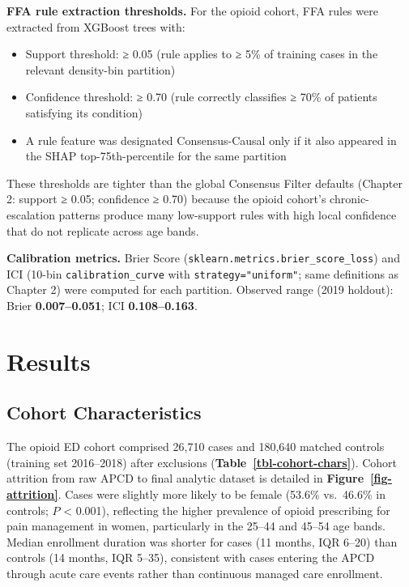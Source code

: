 \documentclass[
  12pt,
]{book}
\providecommand{\tightlist}{%
  \setlength{\itemsep}{0pt}\setlength{\parskip}{0pt}}
\begin{document}
\textbf{FFA rule extraction thresholds.} For the opioid cohort, FFA
rules were extracted from XGBoost trees with:

\begin{itemize}
\tightlist
\item
  Support threshold: ≥ 0.05 (rule applies to ≥ 5\% of training cases in
  the relevant density-bin partition)
\item
  Confidence threshold: ≥ 0.70 (rule correctly classifies ≥ 70\% of
  patients satisfying its condition)
\item
  A rule feature was designated Consensus-Causal only if it also
  appeared in the SHAP top-75th-percentile for the same partition
\end{itemize}

These thresholds are tighter than the global Consensus Filter defaults
(Chapter 2: support ≥ 0.05; confidence ≥ 0.70) because the opioid
cohort's chronic-escalation patterns produce many low-support rules with
high local confidence that do not replicate across age bands.

\textbf{Calibration metrics.} Brier Score
(\texttt{sklearn.metrics.brier\_score\_loss}) and ICI (10-bin
\texttt{calibration\_curve} with \texttt{strategy="uniform"}; same
definitions as Chapter 2) were computed for each partition. Observed
range (2019 holdout): Brier \textbf{0.007--0.051}; ICI
\textbf{0.108--0.163}.

\chapter{Results}\label{sec-results}

\section{Cohort Characteristics}\label{cohort-characteristics-1}

The opioid ED cohort comprised 26,710 cases and 180,640 matched controls
(training set 2016--2018) after exclusions
(\textbf{Table~\ref{tbl-cohort-chars}}). Cohort attrition from raw APCD
to final analytic dataset is detailed in
\textbf{Figure~\ref{fig-attrition}}. Cases were slightly more likely to
be female (53.6\% vs.~46.6\% in controls; \(P\) \textless{} 0.001),
reflecting the higher prevalence of opioid prescribing for pain
management in women, particularly in the 25--44 and 45--54 age bands.
Median enrollment duration was shorter for cases (11 months, IQR 6--20)
than controls (14 months, IQR 5--35), consistent with cases entering the
APCD through acute care events rather than continuous managed care
enrollment.
\end{document}
